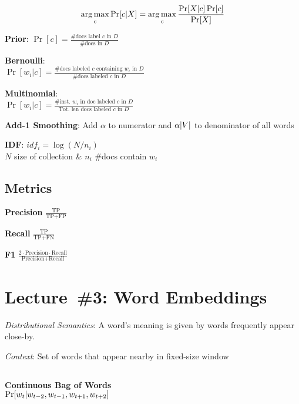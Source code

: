 \documentclass[9pt]{extarticle}
\renewcommand{\green}[1]{{\color{ForestGreen} #1}}
\begin{document}
\begin{multicols}{3}
  \begin{equation*}\label{eq:L02:NaiveBayes}
    \operatorname*{arg\,max}_c \Pr\lbrack c \vert X\rbrack = \operatorname*{arg\,max}_{c} \frac{\Pr[X \vert c] \Pr[c]}{\Pr[X]}
  \end{equation*}

  \green{\textbf{Prior}}: $\Pr[c] = \frac{\text{\#docs label } c \text{ in } D}{\text{\#docs in } D}$

  \green{\textbf{Bernoulli}}: \\ $\Pr[w_ i \vert c] = \frac{\text{\# docs labeled } c \text{ containing } w_i \text{ in } D}{\text{\#docs labeled } c \text{ in } D}$

  \green{\textbf{Multinomial}}: \\ $\Pr[w_i \vert c] = \frac{\text{\# inst.\ } w_i \text{ in doc labeled } c \text{ in } D}{\text{Tot.\ len docs labeled } c \text{ in } D}$

  \green{\textbf{Add-1 Smoothing}}: Add $\alpha$ to numerator and $\alpha\lvert V\rvert$ to denominator of all words

  \textbf{\green{IDF}}: $idf_i = \log \left(N/n_i\right)$ \\ $N$ size of collection \& $n_i$ \#docs contain $w_i$

  \subsection*{Metrics}

  \textbf{\green{Precision}} $\frac{\text{TP}}{\text{TP} + \text{FP}}$

  \textbf{\green{Recall}} $\frac{\text{TP}}{\text{TP} + \text{FN}}$

  \textbf{\green{F1}} $\frac{2 \cdot \text{Precision} \cdot \text{Recall}}{\text{Precision} + \text{Recall}}$

  \section*{Lecture~\#3: Word Embeddings}
  \textit{Distributional Semantics}: A word's meaning is given by words frequently appear close-by.

  \textit{Context}: Set of words that appear nearby in fixed-size window

  \subsection*{}

  \textbf{\green{Continuous Bag of Words}} \\ ${\Pr\lbrack w_t \vert w_{t-2}, w_{t-1}, w_{t+1}, w_{t+2}\rbrack}$


\end{multicols}
\end{document}
